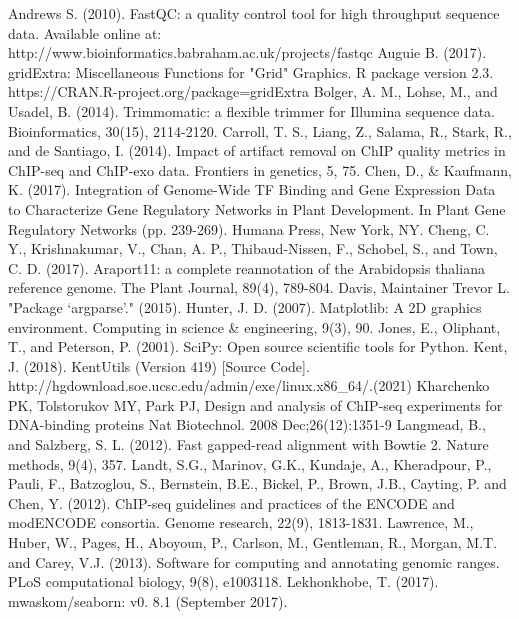 \documentclass{article}
\begin{document}
\begin{sloppypar}
\begin{thebibliography}{9}
Andrews S. (2010). FastQC: a quality control tool for high throughput sequence data. Available online at: http://www.bioinformatics.babraham.ac.uk/projects/fastqc
Auguie B. (2017). gridExtra: Miscellaneous Functions for "Grid" Graphics. R package version 2.3. https://CRAN.R-project.org/package=gridExtra
Bolger, A. M., Lohse, M., and Usadel, B. (2014). Trimmomatic: a flexible trimmer for Illumina sequence data. Bioinformatics, 30(15), 2114-2120.
Carroll, T. S., Liang, Z., Salama, R., Stark, R., and de Santiago, I. (2014). Impact of artifact removal on ChIP quality metrics in ChIP-seq and ChIP-exo data. Frontiers in genetics, 5, 75.
Chen, D., \& Kaufmann, K. (2017). Integration of Genome-Wide TF Binding and Gene Expression Data to Characterize Gene Regulatory Networks in Plant Development. In Plant Gene Regulatory Networks (pp. 239-269). Humana Press, New York, NY.
Cheng, C. Y., Krishnakumar, V., Chan, A. P., Thibaud‐Nissen, F., Schobel, S., and Town, C. D. (2017). Araport11: a complete reannotation of the Arabidopsis thaliana reference genome. The Plant Journal, 89(4), 789-804.
Davis, Maintainer Trevor L. "Package ‘argparse’." (2015).
Hunter, J. D. (2007). Matplotlib: A 2D graphics environment. Computing in science \& engineering, 9(3), 90.
Jones, E., Oliphant, T., and Peterson, P. (2001). SciPy: Open source scientific tools for Python.
Kent, J. (2018). KentUtils (Version 419) [Source Code]. http://hgdownload.soe.ucsc.edu/admin/exe/linux.x86\_64/.(2021)
Kharchenko PK, Tolstorukov MY, Park PJ, Design and analysis of ChIP-seq experiments for DNA-binding proteins Nat Biotechnol. 2008 Dec;26(12):1351-9
Langmead, B., and Salzberg, S. L. (2012). Fast gapped-read alignment with Bowtie 2. Nature methods, 9(4), 357.
Landt, S.G., Marinov, G.K., Kundaje, A., Kheradpour, P., Pauli, F., Batzoglou, S., Bernstein, B.E., Bickel, P., Brown, J.B., Cayting, P. and Chen, Y. (2012). ChIP-seq guidelines and practices of the ENCODE and modENCODE consortia. Genome research, 22(9), 1813-1831.
Lawrence, M., Huber, W., Pages, H., Aboyoun, P., Carlson, M., Gentleman, R., Morgan, M.T. and Carey, V.J. (2013). Software for computing and annotating genomic ranges. PLoS computational biology, 9(8), e1003118.
Lekhonkhobe, T. (2017). mwaskom/seaborn: v0. 8.1 (September 2017). 

\end{thebibliography}
\end{sloppypar}
\end{document}
